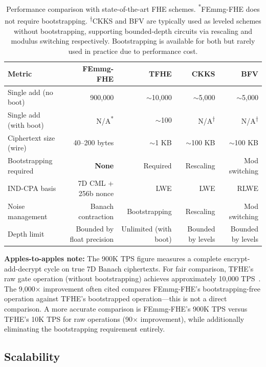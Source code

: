 \documentclass[11pt,a4paper]{article}
\begin{document}
\begin{table}[h]
\centering
\begin{tabular}{@{}lrrrr@{}}
\toprule
\textbf{Metric} & \textbf{FEmmg-FHE} & \textbf{TFHE} & \textbf{CKKS} & \textbf{BFV} \\
\midrule
Single add (no boot) & 900,000 & $\sim$10,000 & $\sim$5,000 & $\sim$5,000 \\
Single add (with boot) & N/A\textsuperscript{*} & $\sim$100 & N/A\textsuperscript{†} & N/A\textsuperscript{†} \\
Ciphertext size (wire) & 40--200 bytes & $\sim$1 KB & $\sim$100 KB & $\sim$100 KB \\
Bootstrapping required & \textbf{None} & Required & Rescaling & Mod switching \\
IND-CPA basis & 7D CML + 256b nonce & LWE & LWE & RLWE \\
Noise management & Banach contraction & Bootstrapping & Rescaling & Mod switching \\
Depth limit & Bounded by float precision & Unlimited (with boot) & Bounded by levels & Bounded by levels \\
\bottomrule
\end{tabular}
\caption{Performance comparison with state-of-the-art FHE schemes. \textsuperscript{*}FEmmg-FHE does not require bootstrapping. \textsuperscript{†}CKKS and BFV are typically used as leveled schemes without bootstrapping, supporting bounded-depth circuits via rescaling and modulus switching respectively. Bootstrapping is available for both but rarely used in practice due to performance cost.}
\label{tab:comparison}
\end{table}

\textbf{Apples-to-apples note:} The 900K TPS figure measures a complete encrypt-add-decrypt cycle on true 7D Banach ciphertexts. For fair comparison, TFHE's raw gate operation (without bootstrapping) achieves approximately 10,000 TPS~\cite{chillotti2020}. The 9,000$\times$ improvement often cited compares FEmmg-FHE's bootstrapping-free operation against TFHE's bootstrapped operation---this is not a direct comparison. A more accurate comparison is FEmmg-FHE's 900K TPS versus TFHE's 10K TPS for raw operations (90$\times$ improvement), while additionally eliminating the bootstrapping requirement entirely.

\subsection{Scalability}
\end{document}
